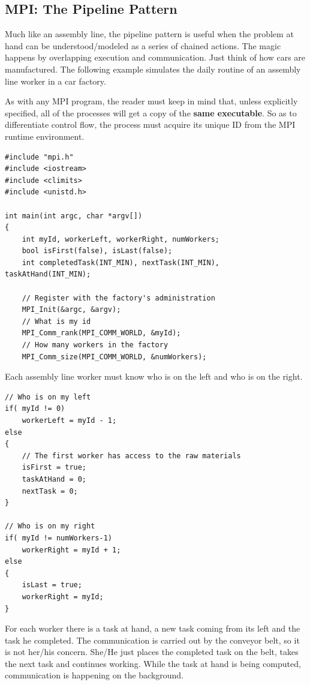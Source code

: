\documentclass[11pt]{article}
\begin{document}
\clearpage

\subsection{MPI: The Pipeline Pattern}
\label{AppendixD}

Much like an assembly line, 
the pipeline pattern is useful when the problem at hand can be understood/modeled as a series of chained actions.
The magic happens by overlapping execution and communication.
Just think of how cars are manufactured.
The following example simulates the daily routine of an assembly line worker in a car factory.

As with any MPI program, the reader must keep in mind that, unless explicitly specified, all of the processes will get a copy of the \textbf{same executable}.
So as to differentiate control flow, the process must acquire its unique ID from the MPI runtime environment.
\begin{verbatim}
#include "mpi.h"
#include <iostream>
#include <climits>
#include <unistd.h> 

int main(int argc, char *argv[])
{
    int myId, workerLeft, workerRight, numWorkers;
    bool isFirst(false), isLast(false);
    int completedTask(INT_MIN), nextTask(INT_MIN), taskAtHand(INT_MIN);

    // Register with the factory's administration
    MPI_Init(&argc, &argv);
    // What is my id
    MPI_Comm_rank(MPI_COMM_WORLD, &myId);
    // How many workers in the factory
    MPI_Comm_size(MPI_COMM_WORLD, &numWorkers);
\end{verbatim}

Each assembly line worker must know who is on the left and who is on the right.
\begin{verbatim}
// Who is on my left
if( myId != 0)
    workerLeft = myId - 1;
else
{
    // The first worker has access to the raw materials
    isFirst = true;
    taskAtHand = 0;
    nextTask = 0;
}

// Who is on my right
if( myId != numWorkers-1)
    workerRight = myId + 1;
else
{
    isLast = true;
    workerRight = myId;	
}
\end{verbatim}


For each worker there is a task at hand, a new task coming from its left and the task he completed.
The communication is carried out by the conveyor belt, so it is not her/his concern.
She/He just places the completed task on the belt, takes the next task and continues working.
While the task at hand is being computed, communication is happening on the background.
\end{document}
